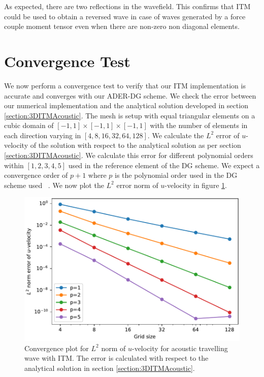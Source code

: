 As expected, there are two reflections in the wavefield. This confirms that \ac{ITM} could be used to obtain a reversed wave in case of waves generated by a force couple moment tensor even when there are non-zero non diagonal elements.
\section{Convergence Test}\label{sec:convergence}
We now perform a convergence test to verify that our \ac{ITM} implementation is accurate and converges with our \ac{ADER}-\ac{DG} scheme. 
We check the error between our numerical implementation and the analytical solution developed in section \ref{section:3DITMAcoustic}. 
The mesh is setup with equal triangular elements on a cubic domain of $\left[-1, 1\right] \times \left[-1, 1\right] \times \left[-1, 1\right]$ with the number of elements in each direction varying in $\left[4, 8, 16, 32, 64, 128\right]$.
We calculate the $L^2$ error of $u$-velocity of the solution with respect to the analytical solution as per section \ref{section:3DITMAcoustic}. We calculate this error for different polynomial
orders within $\left[1, 2, 3, 4, 5\right]$ used in the reference element of the \ac{DG} scheme. We expect a convergence order of $p+1$ where $p$ is the polynomial order used in the
\ac{DG} scheme used ~\parencite{cockburn2011discontinuous}. We now plot the $L^2$ error norm of $u$-velocity in figure \ref{fig:convergence}.

\begin{figure}[!htpb]
    \centering
    \includegraphics[width=0.8\linewidth]{figures/error1.pdf}
    \caption{Convergence plot for $L^2$ norm of $u$-velocity for acoustic travelling wave with \ac{ITM}. The error is calculated with respect to the analytical solution
    in section \ref{section:3DITMAcoustic}.}
    \label{fig:convergence}
\end{figure}

